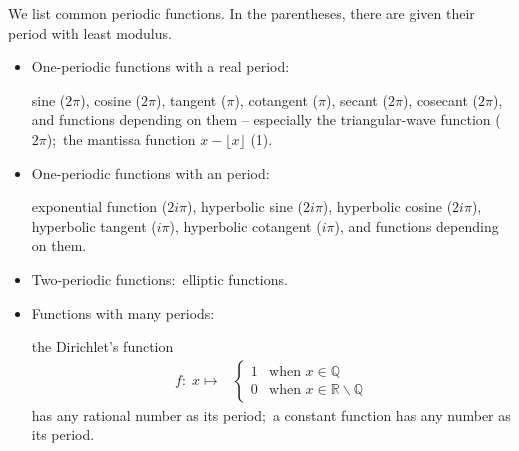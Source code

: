 \documentclass[12pt]{article}
\theoremstyle{definition}
\begin{document}
We list common periodic functions. In the parentheses, there are given their period with least modulus.

\begin{itemize}

\item One-periodic functions with a real period:

sine ($2\pi$), cosine ($2\pi$), tangent ($\pi$), cotangent ($\pi$), secant ($2\pi$), cosecant ($2\pi$), and functions depending on them -- especially the triangular-wave function ($2\pi$); \,the mantissa function
$x\!-\!\lfloor{x}\rfloor$ (1). 

\item One-periodic functions with an  period:

exponential  function ($2i\pi$), hyperbolic sine ($2i\pi$), hyperbolic cosine ($2i\pi$), hyperbolic tangent ($i\pi$), hyperbolic cotangent ($i\pi$), and functions depending on them.

\item Two-periodic functions:\, elliptic functions.

\item Functions with  many periods:

the Dirichlet's function
\begin{eqnarray*}
 f\!:\; x\mapsto\! & \left\{ \begin {array}{ll} 1 & \mbox{when}\,\,x \in \mathbb{Q}\\
 0 & \mbox{when}\,\, x \in \mathbb{R}\!\smallsetminus\!\mathbb{Q}
 \end{array} \right.
 \end{eqnarray*}
has any rational number as its period;\, a constant function has any number as its period.

\end{itemize}
\end{document}
